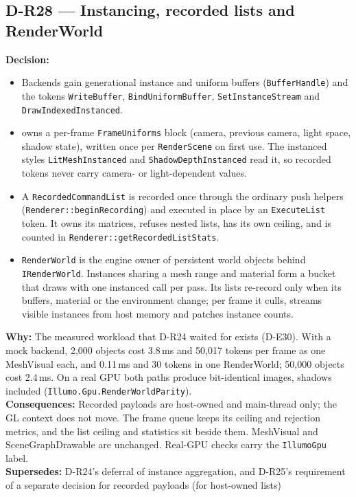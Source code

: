 \subsection*{D-R28 --- Instancing, recorded lists and RenderWorld}
\begin{decisionbox}[title={D-R28 \quad 2026-09-26}]
\textbf{Decision:}
\begin{itemize}
  \item Backends gain generational instance and uniform buffers
    (\texttt{BufferHandle}) and the tokens \texttt{WriteBuffer},
    \texttt{BindUniformBuffer}, \texttt{SetInstanceStream} and
    \texttt{DrawIndexedInstanced}.
  \item {} owns a per-frame \texttt{FrameUniforms} block
    (camera, previous camera, light space, shadow state), written once per
    \texttt{RenderScene} on first use. The instanced styles
    \texttt{LitMeshInstanced} and \texttt{ShadowDepthInstanced} read it, so
    recorded tokens never carry camera- or light-dependent values.
  \item A \texttt{RecordedCommandList} is recorded once through the ordinary
    push helpers (\texttt{Renderer::beginRecording}) and executed in place by
    an \texttt{ExecuteList} token. It owns its matrices, refuses nested
    lists, has its own ceiling, and is counted in
    \texttt{Renderer::getRecordedListStats}.
  \item \texttt{RenderWorld} is the engine owner of persistent world objects
    behind \texttt{IRenderWorld}. Instances sharing a mesh range and
    material form a bucket that draws with one instanced call per pass. Its
    lists re-record only when its buffers, material or the environment
    change; per frame it culls, streams visible instances from host memory
    and patches instance counts.
\end{itemize}
\textbf{Why:} The measured workload that D-R24 waited for exists (D-E30).
With a mock backend, 2,000 objects cost 3.8\,ms and 50,017 tokens per frame
as one MeshVisual each, and 0.11\,ms and 30 tokens in one RenderWorld; 50,000
objects cost 2.4\,ms. On a real GPU both paths produce bit-identical images,
shadows included (\texttt{Illumo.Gpu.RenderWorldParity}).\\
\textbf{Consequences:} Recorded payloads are host-owned and main-thread only;
the GL context does not move. The frame queue keeps its ceiling and
rejection metrics, and the list ceiling and statistics sit beside them.
MeshVisual and SceneGraphDrawable are unchanged. Real-GPU checks carry the
\texttt{IllumoGpu} label.\\
\textbf{Supersedes:} D-R24's deferral of instance aggregation, and D-R25's
requirement of a separate decision for recorded payloads (for host-owned
lists)
\end{decisionbox}

